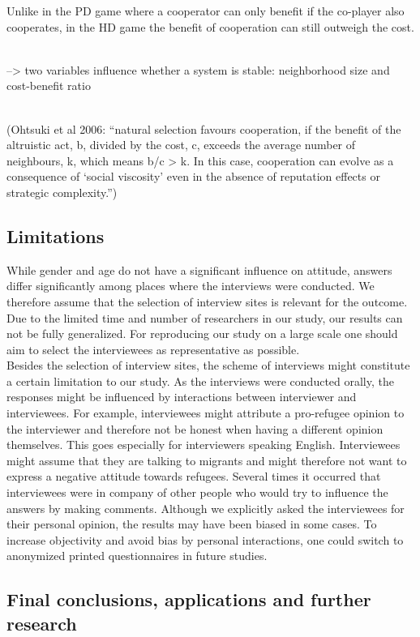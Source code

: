 Unlike in the PD game where a cooperator can only benefit if the co-player also cooperates, in the HD game the benefit of cooperation can still outweigh the cost.

\\
--> two variables influence whether a system is stable: neighborhood size and cost-benefit ratio

\\
(Ohtsuki et al 2006:
 ``natural selection favours cooperation, if the
 benefit of the altruistic act, b, divided by the cost, c, exceeds the
 average number of neighbours, k, which means b/c > k. In this
 case, cooperation can evolve as a consequence of ‘social viscosity’
 even in the absence of reputation effects or strategic complexity.'')
 

\subsection{Limitations}
While gender and age do not have a significant influence on attitude, answers differ significantly among places where the interviews were conducted. We therefore assume that the selection of interview sites is relevant for the outcome. Due to the limited time and number of researchers in our study, our results can not be fully generalized. For reproducing our study on a large scale one should aim to select the interviewees as representative as possible.\\
Besides the selection of interview sites, the scheme of interviews might constitute a certain limitation to our study. As the interviews were conducted orally, the responses might be influenced by interactions between interviewer and interviewees. For example, interviewees might attribute a pro-refugee opinion to the interviewer and therefore not be honest when having a different opinion themselves. This goes especially for interviewers speaking English. Interviewees might assume that they are talking to migrants and might therefore not want to express a negative attitude towards refugees. Several times it occurred that interviewees were in company of other people who would try to influence the answers by making comments. Although we explicitly asked the interviewees for their personal opinion, the results may have been biased in some cases. To increase objectivity and avoid bias by personal interactions, one could switch to anonymized printed questionnaires in future studies.\\

\subsection{Final conclusions, applications and further research}

